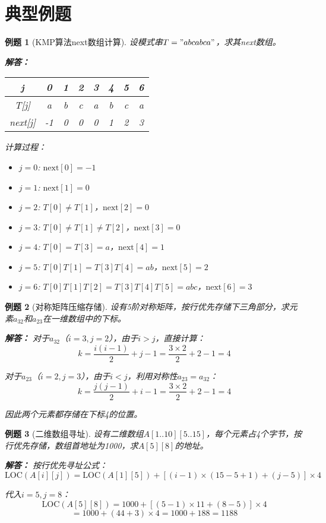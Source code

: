 \documentclass[12pt,a4paper]{amsart}
\newtheorem{example}{例题}[section]
\begin{document}
\section{典型例题}

\begin{example}[KMP算法next数组计算]
设模式串$T = "abcabca"$，求其next数组。

\textbf{解答：}
\begin{center}
\begin{tabular}{|c|c|c|c|c|c|c|c|}
\hline
j & 0 & 1 & 2 & 3 & 4 & 5 & 6 \\
\hline
T[j] & a & b & c & a & b & c & a \\
\hline
next[j] & -1 & 0 & 0 & 0 & 1 & 2 & 3 \\
\hline
\end{tabular}
\end{center}

计算过程：
\begin{itemize}
\item $j=0$: $\text{next}[0] = -1$
\item $j=1$: $\text{next}[1] = 0$
\item $j=2$: $T[0] \neq T[1]$，$\text{next}[2] = 0$
\item $j=3$: $T[0] \neq T[1] \neq T[2]$，$\text{next}[3] = 0$
\item $j=4$: $T[0] = T[3] = a$，$\text{next}[4] = 1$
\item $j=5$: $T[0]T[1] = T[3]T[4] = ab$，$\text{next}[5] = 2$
\item $j=6$: $T[0]T[1]T[2] = T[3]T[4]T[5] = abc$，$\text{next}[6] = 3$
\end{itemize}
\end{example}

\begin{example}[对称矩阵压缩存储]
设有5阶对称矩阵，按行优先存储下三角部分，求元素$a_{32}$和$a_{23}$在一维数组中的下标。

\textbf{解答：}
对于$a_{32}$（$i=3, j=2$），由于$i > j$，直接计算：
$$k = \frac{i(i-1)}{2} + j - 1 = \frac{3 \times 2}{2} + 2 - 1 = 4$$

对于$a_{23}$（$i=2, j=3$），由于$i < j$，利用对称性$a_{23} = a_{32}$：
$$k = \frac{j(j-1)}{2} + i - 1 = \frac{3 \times 2}{2} + 2 - 1 = 4$$

因此两个元素都存储在下标4的位置。
\end{example}

\begin{example}[二维数组寻址]
设有二维数组$A[1..10][5..15]$，每个元素占4个字节，按行优先存储，数组首地址为1000，求$A[5][8]$的地址。

\textbf{解答：}
按行优先寻址公式：
$$\text{LOC}(A[i][j]) = \text{LOC}(A[1][5]) + [(i-1) \times (15-5+1) + (j-5)] \times 4$$

代入$i=5, j=8$：
$$\text{LOC}(A[5][8]) = 1000 + [(5-1) \times 11 + (8-5)] \times 4$$
$$= 1000 + (44 + 3) \times 4 = 1000 + 188 = 1188$$
\end{example}
\end{document}
